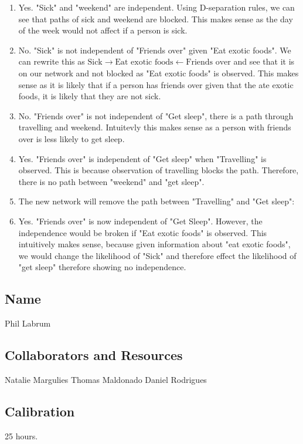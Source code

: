 \documentclass[submit]{harvardml}
\newcommand{\attr}[1]{\textsf{#1}}
\begin{document}
\begin{enumerate}
    \item Yes. "Sick" and "weekend" are independent. Using D-separation rules, we can see that paths of sick and weekend are blocked. This makes sense as the day of the week would not affect if a person is sick.
    \item No. "Sick" is not independent of "Friends over" given "Eat exotic foods". We can rewrite this as $\text{Sick} \rightarrow \text{Eat exotic foods} \leftarrow \text{Friends over}$ and see that it is on our network and not blocked as "Eat exotic foods" is observed. This makes sense as it is likely that if a person has friends over given that the ate exotic foods, it is likely that they are not sick.
    \item No. "Friends over" is not independent of "Get sleep", there is a path through travelling and weekend. Intuitevly this makes sense as a person with friends over is less likely to get sleep. 
    \item Yes. "Friends over" is independent of "Get sleep" when "Travelling" is observed. This is because observation of travelling blocks the path. Therefore, there is no path between "weekend" and "get sleep".
    \item The new network will remove the path between "Travelling" and "Get sleep":
    \begin{center}
    \end{center}
    
    \item Yes. "Friends over" is now independent of "Get Sleep". However, the independence would be broken if "Eat exotic foods" is observed. This intuitively makes sense, because given information about "eat exotic foods", we would change the likelihood of "Sick" and therefore effect the likelihood of "get sleep" therefore showing no independence. 
\end{enumerate}


\newpage
\subsection*{Name}
Phil Labrum
\subsection*{Collaborators and Resources}
Natalie Margulies
Thomas Maldonado
Daniel Rodrigues

\subsection*{Calibration}
25 hours.
\end{document}
